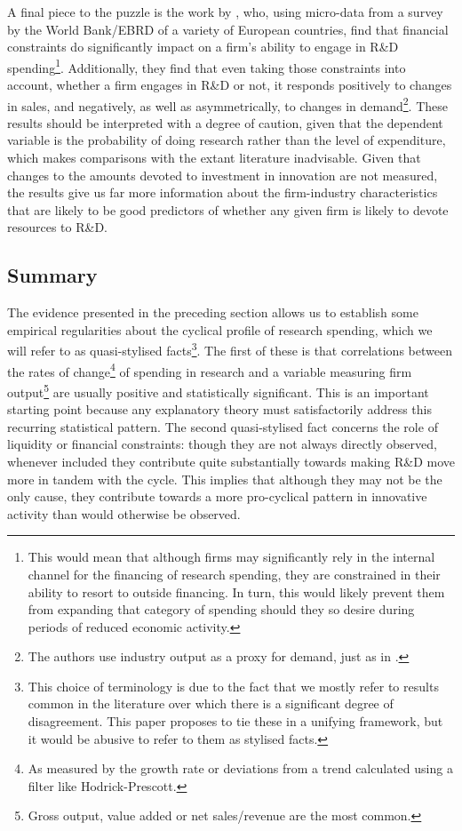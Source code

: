 \documentclass{_latex/house}
\begin{document}
A final piece to the puzzle is the work by \cite{RePEc:eea:boewps:wp2011-09}, who, using micro-data from a survey by the World Bank/EBRD of a variety of European countries, find that financial constraints do significantly impact on a firm's ability to engage in R\&D spending\footnote{This would mean that although firms may significantly rely in the internal channel for the financing of research spending, they are constrained in their ability to resort to outside financing. In turn, this would likely prevent them from expanding that category of spending should they so desire during periods of reduced economic activity.}. Additionally, they find that even taking those constraints into account, whether a firm engages in R\&D or not, it responds positively to changes in sales, and negatively, as well as asymmetrically, to changes in demand\footnote{The authors use industry output as a proxy for demand, just as in \cite{doi:10.1080/0003684042000217959}.}. These results should be interpreted with a degree of caution, given that the dependent variable is the probability of doing research rather than the level of expenditure, which makes comparisons with the extant literature inadvisable. Given that changes to the amounts devoted to investment in innovation are not measured, the results give us far more information about the firm-industry characteristics that are likely to be good predictors of whether any given firm is likely to devote resources to R\&D.
\subsection{Summary} \label{summary}
The evidence presented in the preceding section allows us to establish some empirical regularities about the cyclical profile of research spending, which we will refer to as quasi-stylised facts\footnote{This choice of terminology is due to the fact that we mostly refer to results common in the literature over which there is a significant degree of disagreement. This paper proposes to tie these in a unifying framework, but it would be abusive to refer to them as stylised facts.}. The first of these is that correlations between the rates of change\footnote{As measured by the growth rate or deviations from a trend calculated using a filter like Hodrick-Prescott.} of spending in research and a variable measuring firm output\footnote{Gross output, value added or net sales/revenue are the most common.} are usually positive and statistically significant. This is an important starting point because any explanatory theory must satisfactorily address this recurring statistical pattern. The second quasi-stylised fact concerns the role of liquidity or financial constraints: though they are not always directly observed, whenever included they contribute quite substantially towards making R\&D move more in tandem with the cycle. This implies that although they may not be the only cause, they contribute towards a more pro-cyclical pattern in innovative activity than would otherwise be observed.
\end{document}
